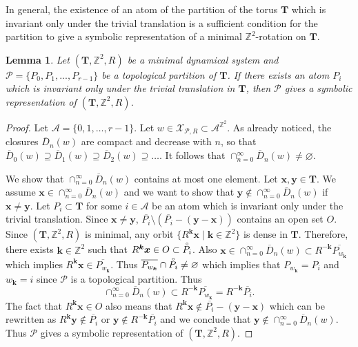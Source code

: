 \documentclass[12pt]{amsart}
\newtheorem{lemma}[definition]{Lemma}
\newcommand{\Z}{\mathbb{Z}}
\newcommand{\R}{\mathbb{R}}
\newcommand{\be}{{\boldsymbol{e}}}
\newcommand{\bk}{{\boldsymbol{k}}}
\newcommand{\bx}{{\boldsymbol{x}}}
\newcommand{\by}{{\boldsymbol{y}}}
\newcommand{\Acal}{\mathcal{A}} %
\newcommand{\Pcal}{\mathcal{P}}
\newcommand{\Xcal}{\mathcal{X}} %
\newcommand{\interior}[1]{\accentset{\circ}{#1}}
\newcommand{\generictorus}{{\boldsymbol{T}}}
\begin{document}
In general, the existence of an atom of the partition of the torus $\generictorus$ which is invariant only under the trivial
translation is a sufficient condition for
the partition to give a symbolic representation of a minimal $\Z^2$-rotation on $\generictorus$.

\begin{lemma}\label{lem:symbolic-representation}
    {\rm\cite[Lemma~3.4]{MR4213162}}
    Let $(\generictorus,\Z^2,R)$ be a minimal dynamical system
    and $\Pcal=\{P_0,P_1,...,P_{r-1}\}$ be a topological partition
    of $\generictorus$.
    If there exists an atom $P_i$ which is invariant only under the trivial
    translation in $\generictorus$,
    then $\Pcal$ gives a symbolic representation of $(\generictorus,\Z^2,R)$.
\end{lemma}

\begin{proof}
    Let $\Acal=\{0,1,\dots,r-1\}$.
    Let $w\in\Xcal_{\Pcal,R}\subset\Acal^{\Z^2}$.
    As already noticed,
    the closures $\overline{D}_n(w)$ are compact
    and decrease with $n$, so that
    $\overline{D}_0(w)\supseteq
    \overline{D}_1(w)\supseteq
    \overline{D}_2(w)\supseteq
    \dots$.
    It follows that $\cap_{n=0}^{\infty}\overline{D}_n(w)\neq\varnothing$.

    We show that $\cap_{n=0}^{\infty}\overline{D}_n(w)$
    contains at most one element.
    Let $\bx,\by\in\generictorus$.
    We assume $\bx\in \cap_{n=0}^{\infty}\overline{D}_n(w)$
    and we want to show that $\by\notin \cap_{n=0}^{\infty}\overline{D}_n(w)$
    if $\bx\neq\by$.
    Let $P_i\subset\generictorus$
    for some $i\in\Acal$ be an atom which is invariant only under the
    trivial translation. 
    Since $\bx\neq\by$,
    $\overline{P_i}\setminus (\overline{P_i}-(\by-\bx))$ contains an open set $O$.
    Since $(\generictorus,\Z^2,R)$ is minimal,
    any orbit $\{R^\bk\bx\mid\bk\in\Z^2\}$ is dense in $\generictorus$.
    Therefore, there exists $\bk\in\Z^2$ such that
    $R^\bk\bx\in O\subset\interior{P_i}$. 
    Also $\bx\in \cap_{n=0}^{\infty}\overline{D}_n(w) \subset R^{-\bk}
    \overline{P_{w_\bk}}$ which implies
    $R^\bk\bx\in\overline{P_{w_\bk}}$.
    Thus $\overline{P_{w_\bk}}\cap\interior{P_i}\neq\varnothing$ which implies
    that $P_{w_\bk}=P_i$ and $w_\bk=i$
    since $\Pcal$ is a topological partition. Thus
    \[
        \cap_{n=0}^{\infty}\overline{D}_n(w)
        \subset R^{-\bk} \overline{P_{w_\bk}}
        =R^{-\bk} \overline{P_i}.
    \]
    The fact that $R^\bk\bx\in O$ 
    also means that 
    $R^\bk\bx\notin \overline{P_i}-(\by-\bx)$
    which can be rewritten as $R^\bk\by\notin \overline{P_i}$ or
    $\by\notin R^{-\bk}\overline{P_i}$ and we conclude that $\by\notin
    \cap_{n=0}^{\infty}\overline{D}_n(w)$.
    Thus $\Pcal$ gives a symbolic representation of
    $(\generictorus,\Z^2,R)$.
\end{proof}
\end{document}
